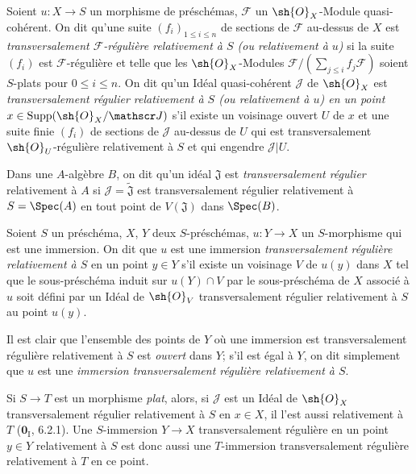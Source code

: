 \begin{definition}[19.2.1]
Soient $u:X\to S$ un morphisme de préschémas, $\mathscr F$ un $\sh{O}_X$-Module quasi-cohérent. On dit qu'une suite $(f_i)_{1\leq i\leq n}$ de sections de $\mathscr F$ au-dessus de $X$ est \emph{transversalement $\mathscr F$-régulière relativement à $S$ (\emph{ou} relativement à $u$)} si la suite $(f_i)$ est $\mathscr F$-régulière et telle que les $\sh{O}_X$-Modules $\mathscr F/(\sum_{j\leq i}f_j\mathscr F)$ soient $S$-plats pour $0\leq i\leq n$. On dit qu'un Idéal quasi-cohérent $\mathscr J$ de $\sh{O}_X$ est \emph{transversalement régulier relativement à $S$ (\emph{ou} relativement à $u$) en un point} $x\in\operatorname{Supp}(\sh{O}_X/\mathscr J)$ s'il existe un voisinage ouvert $U$ de $x$ et une suite finie $(f_i)$ de sections de $\mathscr J$ au-dessus de $U$ qui est transversalement $\sh{O}_U$-régulière relativement à $S$ et qui engendre $\mathscr J|U$.
\end{definition}

Dans une $A$-algèbre $B$, on dit qu'un idéal $\mathfrak J$ est \emph{transversalement régulier} relativement à $A$ si $\mathscr J=\widetilde{\mathfrak J}$ est transversalement régulier relativement à $S=\Spec(A)$ en tout point de $V(\mathfrak J)$ dans $\Spec(B)$.

\begin{definition}[19.2.2]
Soient $S$ un préschéma, $X$, $Y$ deux $S$-préschémas, $u:Y\to X$ un $S$-morphisme qui est une immersion. On dit que $u$ est une immersion \emph{transversalement régulière relativement à $S$} en un point $y\in Y$ s'il existe un voisinage $V$ de $u(y)$ dans $X$ tel que le sous-préschéma induit sur $u(Y)\cap V$ par le sous-préschéma de $X$ associé à $u$ soit défini par un Idéal de $\sh{O}_V$ transversalement régulier relativement à $S$ au point $u(y)$.
\end{definition}

Il est clair que l'ensemble des points de $Y$ où une immersion est transversalement régulière relativement à $S$ est \emph{ouvert} dans $Y$; s'il est égal à $Y$, on dit simplement que $u$ est une \emph{immersion transversalement régulière relativement à $S$}.

Si $S\to T$ est un morphisme \emph{plat}, alors, si $\mathscr J$ est un Idéal de $\sh{O}_X$ transversalement régulier relativement à $S$ en $x\in X$, il l'est aussi relativement à $T$ ($\mathbf{0}_{\mathrm I}$, 6.2.1). Une $S$-immersion $Y\to X$ transversalement régulière en un point $y\in Y$ relativement à $S$ est donc aussi une $T$-immersion transversalement régulière relativement à $T$ en ce point.

